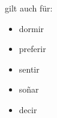 \documentclass[10pt,spanish]{report}
\begin{document}
gilt auch für:
\begin{itemize}
  \item dormir
  \item preferir
  \item sentir
  \item so\~{n}ar
  \item decir
\end{itemize}
\end{document}
